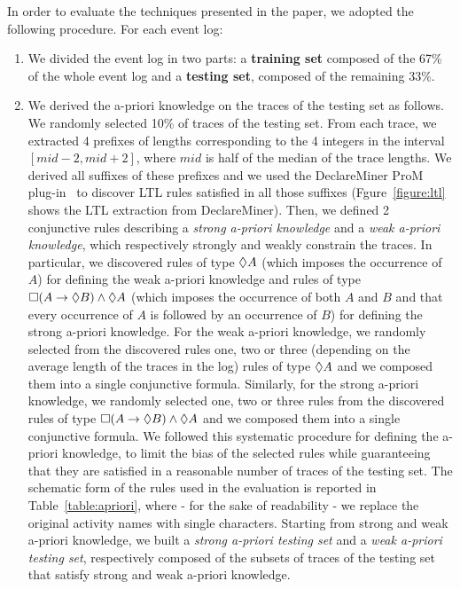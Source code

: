 In order to evaluate the techniques presented in the paper, we adopted the following procedure. For each event log:
\begin{enumerate}
\item We divided the event log in two parts: a \textbf{training set} composed of the 67\% of the whole event log and a \textbf{testing set}, composed of the remaining 33\%.
\item We derived the a-priori knowledge on the traces of the testing set as follows. We randomly selected 10\% of traces of the testing set. From each trace, we extracted 4 prefixes of lengths corresponding to the 4 integers in the interval $\left[mid-2,mid+2\right]$, where $mid$ is half of the median of the trace lengths. We derived all suffixes of these prefixes and we used the DeclareMiner ProM plug-in~\cite{Maggi2012} to discover LTL rules satisfied in all those suffixes (Fgure~\ref{figure:ltl} shows the LTL extraction from DeclareMiner). Then, we defined 2 conjunctive rules describing a \textit{strong a-priori knowledge} and a \textit{weak a-priori knowledge}, which respectively strongly and weakly constrain the traces. In particular, we discovered rules of type $\lozenge A$ (which imposes the occurrence of $A$) for defining the weak a-priori knowledge and rules of type $\square(A \rightarrow \lozenge B) \wedge \lozenge A$ (which imposes the occurrence of both $A$ and $B$ and that every occurrence of $A$ is followed by an occurrence of $B$) for defining the strong a-priori knowledge. For the weak a-priori knowledge, we randomly selected from the discovered rules one, two or three (depending on the average length of the traces in the log) rules of type $\lozenge A$ and we composed them into a single conjunctive formula. Similarly, for the strong a-priori knowledge, we randomly selected one, two or three rules from the discovered rules of type $\square(A \rightarrow \lozenge B) \wedge \lozenge A$ and we composed them into a single conjunctive formula. We followed this systematic procedure for defining the a-priori knowledge, to limit the bias of the selected rules while guaranteeing that they are satisfied in a reasonable number of traces of the testing set. The schematic form of the rules used in the evaluation is reported in Table~\ref{table:apriori}, where - for the sake of readability - we replace the original activity names with single characters. Starting from strong and weak a-priori knowledge, we built a \emph{strong a-priori testing set} and a \emph{weak a-priori testing set}, respectively composed of the subsets of traces of the testing set that satisfy strong and weak a-priori knowledge.


\end{enumerate}
